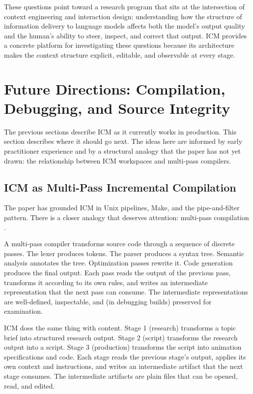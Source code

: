 \documentclass[acmlarge,nonacm,screen]{acmart}
\begin{document}
These questions point toward a research program that sits at the intersection of context engineering and interaction design: understanding how the structure of information delivery to language models affects both the model's output quality and the human's ability to steer, inspect, and correct that output. ICM provides a concrete platform for investigating these questions because its architecture makes the context structure explicit, editable, and observable at every stage.

\section{Future Directions: Compilation, Debugging, and Source Integrity}

The previous sections describe ICM as it currently works in production. This section describes where it should go next. The ideas here are informed by early practitioner experience and by a structural analogy that the paper has not yet drawn: the relationship between ICM workspaces and multi-pass compilers.

\subsection{ICM as Multi-Pass Incremental Compilation}

The paper has grounded ICM in Unix pipelines, Make, and the pipe-and-filter pattern. There is a closer analogy that deserves attention: multi-pass compilation \cite{aho2006}.

A multi-pass compiler transforms source code through a sequence of discrete passes. The lexer produces tokens. The parser produces a syntax tree. Semantic analysis annotates the tree. Optimization passes rewrite it. Code generation produces the final output. Each pass reads the output of the previous pass, transforms it according to its own rules, and writes an intermediate representation that the next pass can consume. The intermediate representations are well-defined, inspectable, and (in debugging builds) preserved for examination.

ICM does the same thing with content. Stage 1 (research) transforms a topic brief into structured research output. Stage 2 (script) transforms the research output into a script. Stage 3 (production) transforms the script into animation specifications and code. Each stage reads the previous stage's output, applies its own context and instructions, and writes an intermediate artifact that the next stage consumes. The intermediate artifacts are plain files that can be opened, read, and edited.
\end{document}
